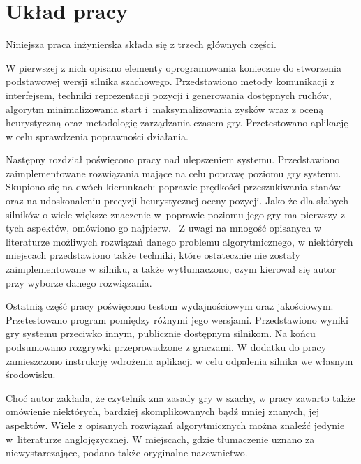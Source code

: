 \section{Układ pracy}
\label{sec:uklad-pracy}

Niniejsza praca inżynierska składa się z trzech głównych części.

W pierwszej z nich opisano elementy oprogramowania konieczne do stworzenia podstawowej wersji silnika szachowego.
Przedstawiono metody komunikacji z interfejsem, techniki reprezentacji pozycji i generowania dostępnych ruchów, algorytm minimalizowania start i~maksymalizowania zysków wraz z oceną heurystyczną oraz metodologię zarządzania czasem gry.
Przetestowano aplikację w celu sprawdzenia poprawności działania.

Następny rozdział poświęcono pracy nad ulepszeniem systemu.
Przedstawiono zaimplementowane rozwiązania mające na celu poprawę poziomu gry systemu.
Skupiono się na dwóch kierunkach: poprawie prędkości przeszukiwania stanów oraz na udoskonaleniu precyzji heurystycznej oceny pozycji.
Jako że dla słabych silników o wiele większe znaczenie w~poprawie poziomu jego gry ma pierwszy z tych aspektów, omówiono go najpierw.~\cite*{Vrzina2023}
Z uwagi na mnogość opisanych w literaturze możliwych rozwiązań danego problemu algorytmicznego, w niektórych miejscach przedstawiono także techniki, które ostatecznie nie zostały zaimplementowane w silniku, a także wytłumaczono, czym kierował się autor przy wyborze danego rozwiązania.

Ostatnią część pracy poświęcono testom wydajnościowym oraz jakościowym.
Przetestowano program pomiędzy różnymi jego wersjami.
Przedstawiono wyniki gry systemu przeciwko innym, publicznie dostępnym silnikom.
Na końcu podsumowano rozgrywki przeprowadzone z graczami.
W dodatku do pracy zamieszczono instrukcję wdrożenia aplikacji w celu odpalenia silnika we własnym środowisku.

Choć autor zakłada, że czytelnik zna zasady gry w szachy, w pracy zawarto także omówienie niektórych, bardziej skomplikowanych bądź mniej znanych, jej aspektów.
Wiele z opisanych rozwiązań algorytmicznych można znaleźć jedynie w~literaturze anglojęzycznej.
W miejscach, gdzie tłumaczenie uznano za niewystarczające, podano także oryginalne nazewnictwo.
